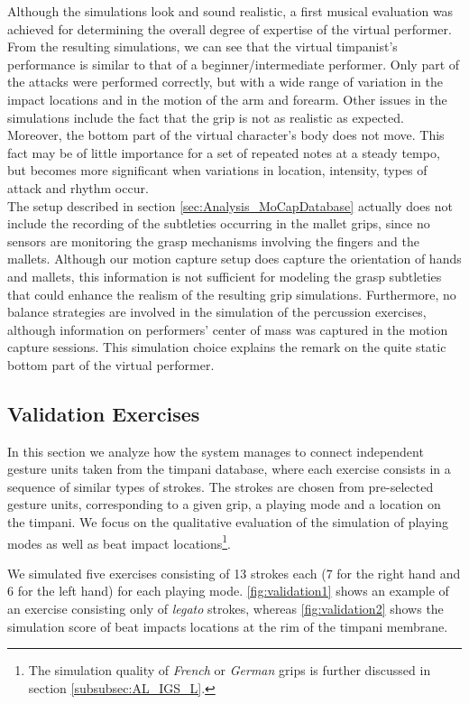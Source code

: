Although the simulations look and sound realistic, a first musical evaluation was achieved for determining the overall degree of expertise of the virtual performer. From the resulting simulations, we can see that the virtual timpanist's performance is similar to that of a beginner/intermediate performer.
Only part of the attacks were performed correctly, but with a wide range of variation in the impact locations and in the motion of the arm and forearm.
Other issues in the simulations include the fact that the grip is not as realistic as expected. Moreover, the bottom part of the virtual character's body does not move. This fact may be of little importance for a set of repeated notes at a steady tempo, but becomes more significant when variations in location, intensity, types of attack and rhythm occur.\\

The setup described in section \ref{sec:Analysis_MoCapDatabase} actually does not include the recording of the subtleties occurring in the mallet grips, since no sensors are monitoring the grasp mechanisms involving the fingers and the mallets. Although our motion capture setup does capture the orientation of hands and mallets, this information is not sufficient for modeling the grasp subtleties that could enhance the realism of the resulting grip simulations. Furthermore, no balance strategies are involved in the simulation of the percussion exercises, although information on performers' center of mass was captured in the motion capture sessions. This simulation choice explains the remark on the quite static bottom part of the virtual performer.


		\subsection{Validation Exercises}
		\label{subsec:Music_Evaluation_Validation}

In this section we analyze how the system manages to connect independent gesture units taken from the timpani database, where each exercise consists in a sequence of similar types of strokes. The strokes are chosen from pre-selected gesture units, corresponding to a given grip, a playing mode and a location on the timpani.
We focus on the qualitative evaluation of the simulation of playing modes as well as beat impact locations\footnote{The simulation quality of \emph{French} or \emph{German} grips is further discussed in section \ref{subsubsec:AL_IGS_L}. }.

We simulated five exercises consisting of 13 strokes each (7 for the right hand and 6 for the left hand) for each playing mode. \myfigname \ref{fig:validation1} shows an example of an exercise consisting only of \emph{legato} strokes, whereas \myfigname \ref{fig:validation2} shows the simulation score of beat impacts locations at the rim of the timpani membrane.\\

